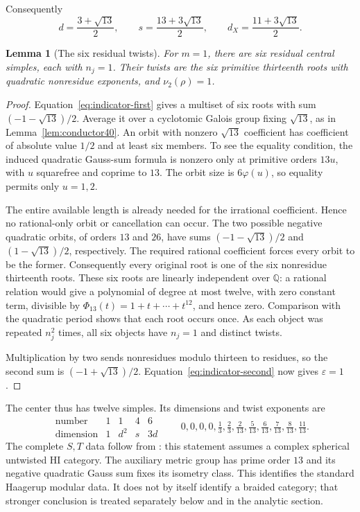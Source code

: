 \documentclass[11pt,a4paper]{article}
\newtheorem{lemma}[theorem]{Lemma}
\theoremstyle{definition}
\begin{document}
Consequently
\begin{equation}
 d=\frac{3+\sqrt{13}}2,\qquad
 s=\frac{13+3\sqrt{13}}2,\qquad
 d_X=\frac{11+3\sqrt{13}}2.
 \label{eq:haagerup-dimensions}
\end{equation}
\begin{lemma}[The six residual twists]\label{lem:six-residual-twists}
For $m=1$, there are six residual central simples, each with $n_j=1$.
Their twists are the six primitive thirteenth roots with quadratic
nonresidue exponents, and $\nu_2(\rho)=1$.
\end{lemma}
\begin{proof}
Equation~\eqref{eq:indicator-first} gives a multiset of six roots
with sum $(-1-\sqrt{13})/2$. Average it over a cyclotomic Galois group
fixing $\sqrt{13}$, as in Lemma~\ref{lem:conductor40}. An orbit with
nonzero $\sqrt{13}$ coefficient has coefficient of absolute value
$1/2$ and at least six members. To see the equality condition, the
induced quadratic Gauss-sum formula is nonzero only at primitive
orders $13u$, with $u$ squarefree and coprime to $13$. The orbit size
is $6\varphi(u)$, so equality permits only $u=1,2$.

The entire available length is already needed for the irrational
coefficient. Hence no rational-only orbit or cancellation can occur.
The two possible negative quadratic orbits, of orders $13$ and $26$,
have sums $(-1-\sqrt{13})/2$ and $(1-\sqrt{13})/2$, respectively.
The required rational coefficient forces every orbit to be the former.
Consequently every original root is one of the six nonresidue
thirteenth roots. These six roots are linearly independent over
$\mathbb Q$: a rational relation would give a polynomial of degree
at most twelve, with zero constant term, divisible by
$\Phi_{13}(t)=1+t+\cdots+t^{12}$, and hence zero.
Comparison with the quadratic period shows that each root occurs
once. As each object was repeated $n_j^2$ times, all six objects have
$n_j=1$ and distinct twists.

Multiplication by two sends nonresidues modulo thirteen to residues,
so the second sum is $(-1+\sqrt{13})/2$.
Equation~\eqref{eq:indicator-second} now gives $\varepsilon=1$.
\end{proof}

The center thus has twelve simples. Its dimensions and twist exponents are
\[
 \begin{array}{c|cccc}
 \text{number}&1&1&4&6\\\hline
 \text{dimension}&1&d^2&s&3d
 \end{array}
 \qquad
 0,0,0,0,\tfrac13,\tfrac23,
 \tfrac2{13},\tfrac5{13},\tfrac6{13},
 \tfrac7{13},\tfrac8{13},\tfrac{11}{13}.
\]
The complete $S,T$ data follow from
\cite[Theorem~A(2), equivalently Theorem~5.1]{GSY}: this statement assumes
a complex spherical untwisted HI category. The auxiliary metric group
has prime order $13$ and its negative quadratic Gauss sum fixes its
isometry class. This identifies the standard Haagerup modular data.
It does not by itself identify a braided category; that stronger
conclusion is treated separately below and in the analytic section.
\end{document}
